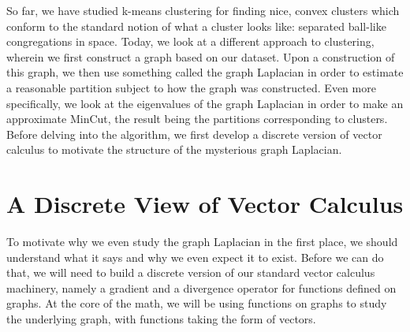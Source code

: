 So far, we have studied k-means clustering for finding nice, convex
clusters which conform to the standard notion of what a cluster looks
like: separated ball-like congregations in space. Today, we look at a
different approach to clustering, wherein we first construct a graph
based on our dataset. Upon a construction of this graph, we then use
something called the graph Laplacian in order to estimate a reasonable
partition subject to how the graph was constructed. Even more
specifically, we look at the eigenvalues of the graph Laplacian in
order to make an approximate MinCut, the result being the partitions
corresponding to clusters. Before delving into the algorithm, we first
develop a discrete version of vector calculus to motivate the
structure of the mysterious graph Laplacian. 

\section{A Discrete View of Vector Calculus}
To motivate why we even study the graph Laplacian in the first place,
we should understand what it says and why we even expect it to
exist. Before we can do that, we will need to build a discrete version
of our standard vector calculus machinery, namely a gradient and a
divergence operator for functions defined on graphs. At the core of
the math, we will be using functions on graphs to study the underlying
graph, with functions taking the form of vectors.


